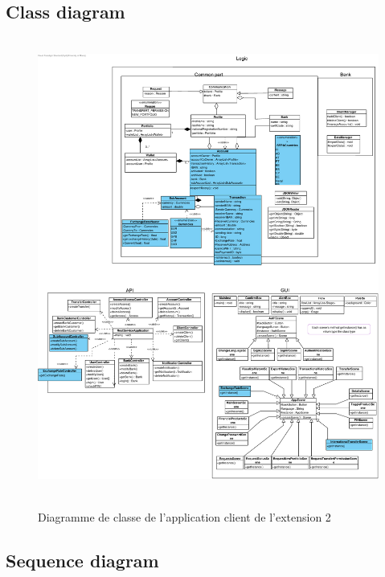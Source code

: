 \documentclass[]{report}
\begin{document}
\newpage

\subsection{Class diagram}

\begin{figure}[h!]
	\hbox{
		\centering\includegraphics[scale=0.69]{img/Class Diagram Client - Extension 2.pdf}
	}
	\caption{Diagramme de classe de l'application client de l'extension 2}
\end{figure}
\newpage

\newpage

\subsection{Sequence diagram}
\end{document}
